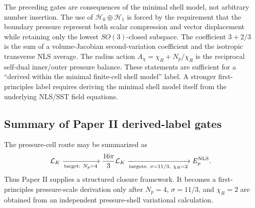 \documentclass[11pt]{article}
\begin{document}
The preceding gates are consequences of the minimal shell model, not arbitrary
number insertion.  The use of \(\mathcal H_0\oplus\mathcal H_1\) is forced by
the requirement that the boundary pressure represent both scalar compression
and vector displacement while retaining only the lowest \(SO(3)\)-closed
subspace.  The coefficient \(3+2/3\) is the sum of a volume-Jacobian
second-variation coefficient and the isotropic transverse NLS average.  The
radius action \(A_\chi=\chi_R+N_p/\chi_R\) is the reciprocal self-dual
inner/outer pressure balance.  These statements are sufficient for a
``derived within the minimal finite-cell shell model'' label.  A stronger
first-principles label requires deriving the minimal shell model itself from
the underlying NLS/SST field equations.

\subsection{Summary of Paper II derived-label gates}

The pressure-cell route may be summarized as
\[
  \mathcal L_K
  \xrightarrow[\text{target: }N_p=4]{}
  \frac{16\pi}{3}\mathcal L_K
  \xrightarrow[\text{targets: }\sigma=11/3,\ \chi_R=2]{}
  E_p^{\rm NLS}.
\]
Thus Paper II supplies a structured closure framework.  It becomes a
first-principles pressure-scale derivation only after \(N_p=4\),
\(\sigma=11/3\), and \(\chi_R=2\) are obtained from an independent
pressure-shell variational calculation.
\end{document}
